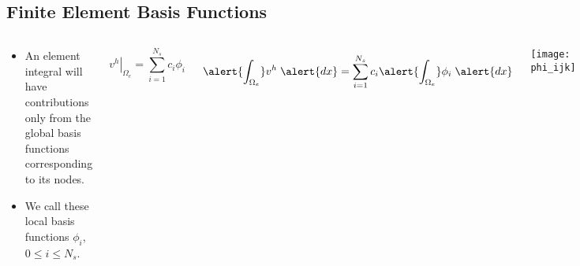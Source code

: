 \subsection*{Finite Element Basis Functions}
\begin{frame}
    \begin{columns}[t]
    \begin{block}{}


	\begin{itemize}
	  \item{An element integral will have contributions only
	    from the global basis functions corresponding to its nodes.}
	  \item{We call these local basis functions $\phi_i$, $0 \leq i \leq N_s$.}
	\end{itemize}
    \end{block}

	    \begin{equation}
	      \nonumber
	      \left. v^h \right|_{\Omega_e} = \sum_{i=1}^{N_s} c_i \phi_i
	    \end{equation}
      {
	    \begin{equation}
	      \nonumber
	      \alert{\int_{\Omega_e}} v^h \;\alert{dx}
	      = \sum_{i=1}^{N_s} c_i \alert{\int_{\Omega_e}}\phi_i \;\alert{dx}
	    \end{equation}

      }
      \begin{center}
	      \texttt{[image: phi\_ijk]}
      \end{center}
    \end{columns}
\end{frame}
